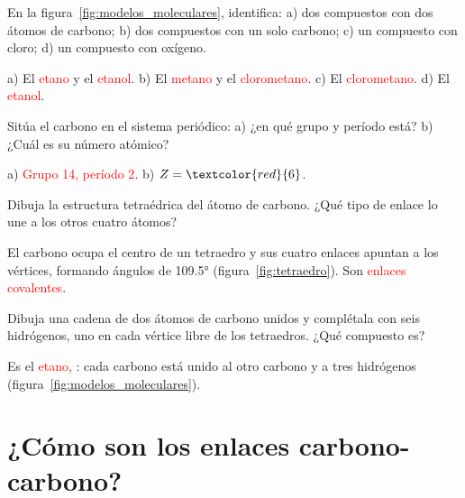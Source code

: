 \begin{exercise}
    En la figura~\ref{fig:modelos_moleculares}, identifica: a) dos compuestos con dos átomos de carbono; b) dos compuestos con un solo carbono; c) un compuesto con cloro; d) un compuesto con oxígeno.
    \begin{solu}
        a) El \textcolor{red}{etano} y el \textcolor{red}{etanol}. b) El \textcolor{red}{metano} y el \textcolor{red}{clorometano}. c) El \textcolor{red}{clorometano}. d) El \textcolor{red}{etanol}.
    \end{solu}
\end{exercise}

\begin{exercise}
    Sitúa el carbono en el sistema periódico: a) ¿en qué grupo y período está? b) ¿Cuál es su número atómico?
    \begin{solu}
        a) \textcolor{red}{Grupo 14, período 2}. b) \(Z = \textcolor{red}{6}\).
    \end{solu}
\end{exercise}

\begin{exercise}
    Dibuja la estructura tetraédrica del átomo de carbono. ¿Qué tipo de enlace lo une a los otros cuatro átomos?
    \begin{solu}
        El carbono ocupa el centro de un tetraedro y sus cuatro enlaces apuntan a los vértices, formando ángulos de \ang{109.5} (figura~\ref{fig:tetraedro}). Son \textcolor{red}{enlaces covalentes}.
    \end{solu}
\end{exercise}

\begin{exercise}
    Dibuja una cadena de dos átomos de carbono unidos y complétala con seis hidrógenos, uno en cada vértice libre de los tetraedros. ¿Qué compuesto es?
    \begin{solu}
        Es el \textcolor{red}{etano}, : cada carbono está unido al otro carbono y a tres hidrógenos (figura~\ref{fig:modelos_moleculares}).
    \end{solu}
\end{exercise}

\section{¿Cómo son los enlaces carbono-carbono?}

